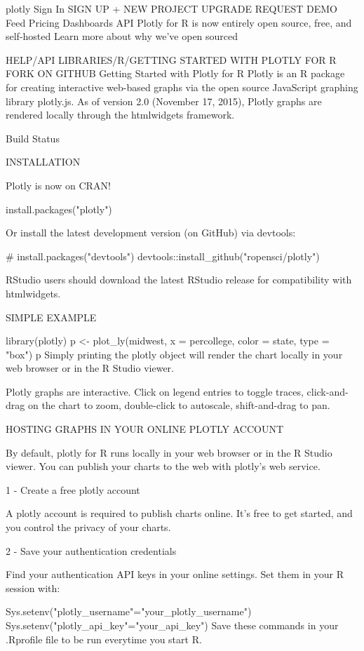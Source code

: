  plotly Sign In SIGN UP  + NEW PROJECT  UPGRADE  REQUEST DEMO Feed Pricing Dashboards API
Plotly for R is now entirely open source, free, and self-hosted
Learn more about why we've open sourced

 HELP/API LIBRARIES/R/GETTING STARTED WITH PLOTLY FOR R FORK ON GITHUB
Getting Started with Plotly for R
Plotly is an R package for creating interactive web-based graphs via the open source JavaScript graphing library plotly.js. As of version 2.0 (November 17, 2015), Plotly graphs are rendered locally through the htmlwidgets framework.

 Build Status

INSTALLATION

Plotly is now on CRAN!

install.packages("plotly")

Or install the latest development version (on GitHub) via devtools:

# install.packages("devtools")
devtools::install_github("ropensci/plotly")

RStudio users should download the latest RStudio release for compatibility with htmlwidgets.

SIMPLE EXAMPLE

library(plotly)
p <- plot_ly(midwest, x = percollege, color = state, type = "box")
p
Simply printing the plotly object will render the chart locally in your web browser or in the R Studio viewer.


Plotly graphs are interactive. Click on legend entries to toggle traces, click-and-drag on the chart to zoom, double-click to autoscale, shift-and-drag to pan.

HOSTING GRAPHS IN YOUR ONLINE PLOTLY ACCOUNT

By default, plotly for R runs locally in your web browser or in the R Studio viewer. You can publish your charts to the web with plotly's web service.

1 - Create a free plotly account

A plotly account is required to publish charts online. It's free to get started, and you control the privacy of your charts.

2 - Save your authentication credentials

Find your authentication API keys in your online settings. Set them in your R session with:

Sys.setenv("plotly_username"="your_plotly_username")
Sys.setenv("plotly_api_key"="your_api_key")
Save these commands in your .Rprofile file to be run everytime you start R.

